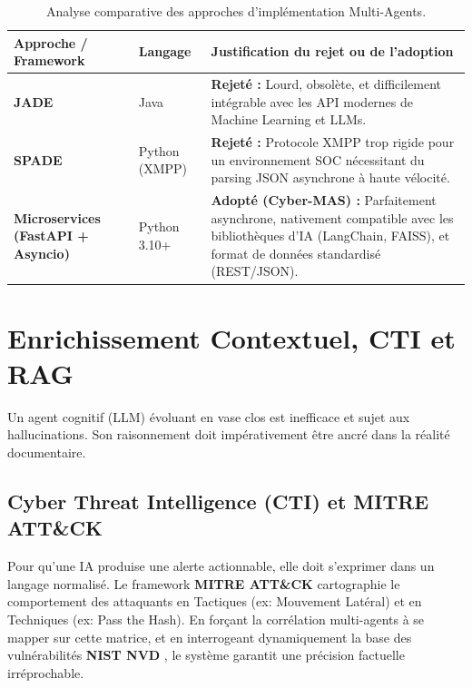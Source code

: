 \documentclass[a4paper, 12pt]{report}
\begin{document}
\begin{table}[htbp]
\centering
\caption[Analyse comparative des approches d'implémentation Multi-Agents]{Analyse comparative des approches d'implémentation Multi-Agents.}
\label{tab:frameworks_mas}
\vspace{0.2cm}
\begin{tabular}{|>{\raggedright\arraybackslash}p{3.5cm}|>{\raggedright\arraybackslash}p{3cm}|>{\raggedright\arraybackslash}p{7cm}|}
\hline
\textbf{Approche / Framework} & \textbf{Langage} & \textbf{Justification du rejet ou de l'adoption} \\ \hline
\textbf{JADE} & Java & \textbf{Rejeté :} Lourd, obsolète, et difficilement intégrable avec les API modernes de Machine Learning et LLMs. \\ \hline
\textbf{SPADE} & Python (XMPP) & \textbf{Rejeté :} Protocole XMPP trop rigide pour un environnement SOC nécessitant du parsing JSON asynchrone à haute vélocité. \\ \hline
\textbf{Microservices (FastAPI + Asyncio)} & Python 3.10+ & \textbf{Adopté (Cyber-MAS) :} Parfaitement asynchrone, nativement compatible avec les bibliothèques d'IA (LangChain, FAISS), et format de données standardisé (REST/JSON). \\ \hline
\end{tabular}
\end{table}

\section{Enrichissement Contextuel, CTI et RAG}
\label{sec:enrichissement_rag}

Un agent cognitif (LLM) évoluant en vase clos est inefficace et sujet aux hallucinations. Son raisonnement doit impérativement être ancré dans la réalité documentaire.

\subsection{Cyber Threat Intelligence (CTI) et MITRE ATT\&CK}
Pour qu'une IA produise une alerte actionnable, elle doit s'exprimer dans un langage normalisé. Le framework \textbf{MITRE ATT\&CK} \cite{mitre_attack} cartographie le comportement des attaquants en Tactiques (ex: Mouvement Latéral) et en Techniques (ex: Pass the Hash). En forçant la corrélation multi-agents à se mapper sur cette matrice, et en interrogeant dynamiquement la base des vulnérabilités \textbf{NIST NVD} \cite{nist_nvd}, le système garantit une précision factuelle irréprochable.
\end{document}

